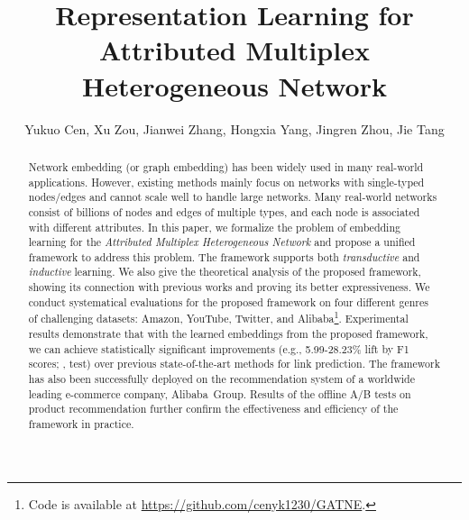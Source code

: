 \documentclass[sigconf]{acmart}
\newcommand{\company}{Alibaba}
\begin{document}
\fancyhead{}

\title{Representation Learning for Attributed Multiplex Heterogeneous Network}


\author[Y. Cen, X. Zou, J. Zhang, H. Yang, J. Zhou and J. Tang]{
    Yukuo Cen, Xu Zou, Jianwei Zhang, Hongxia Yang, Jingren Zhou, Jie Tang
}


\renewcommand{\authors}{Yukuo Cen, Xu Zou, Jianwei Zhang, Hongxia Yang, Jingren Zhou and Jie Tang}
\renewcommand{\shortauthors}{Y. Cen et al.}
\begin{abstract}
\renewcommand{\thefootnote}{\fnsymbol{footnote}}
\renewcommand{\thefootnote}{\arabic{footnote}}

Network embedding (or graph embedding) has been widely used in many real-world applications. However, existing methods mainly focus on networks with single-typed nodes/edges and cannot scale well to handle large networks. Many real-world networks consist of billions of nodes and edges of multiple types, and each node is associated with different attributes. In this paper, we formalize the problem of embedding learning for the \textit{Attributed Multiplex Heterogeneous Network} and propose a unified framework to address this problem. The framework supports both \textit{transductive} and \textit{inductive} learning. We also give the theoretical analysis of the proposed framework, showing its connection with previous works and proving its better expressiveness.
We conduct systematical evaluations for the proposed framework on four different genres of challenging datasets: Amazon, YouTube, Twitter, and \company\footnote{Code is available at \url{https://github.com/cenyk1230/GATNE}.}.
Experimental results demonstrate that with the learned embeddings from the proposed framework, we can achieve statistically significant improvements (e.g., 5.99-28.23\% lift by F1 scores; , test) over previous state-of-the-art methods for link prediction.
The framework has also been successfully deployed on the recommendation system of a worldwide leading e-commerce company, \company\ Group. Results of the offline A/B tests on product recommendation further confirm the effectiveness and efficiency of the framework in practice.
\end{abstract}
\end{document}
